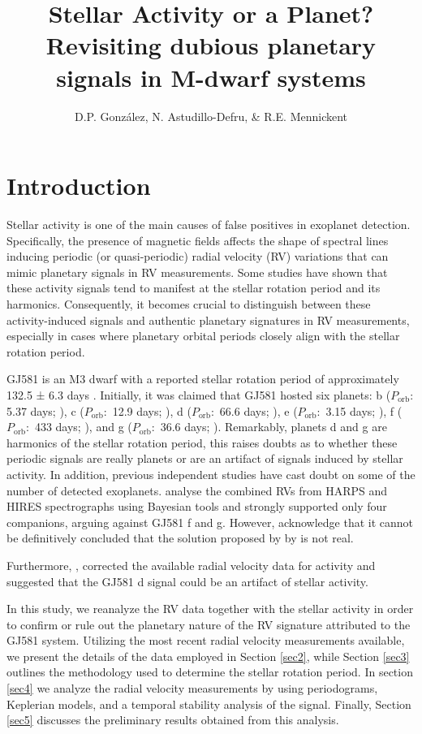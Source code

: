 \documentclass[baaa]{baaa}
\title{Stellar Activity or a Planet? Revisiting dubious planetary signals in M-dwarf systems}
\author{
D.P. González\inst{1},
N. Astudillo-Defru\inst{2},
\&
R.E. Mennickent\inst{1}
}
\institute{
Departamento de Astronomía, Universidad de Concepción, Chile\and Departamento de Matemática y Física Aplicadas, Universidad Católica de la Santísima Concepción, Chile
}
\begin{document}
\maketitle
\section{Introduction}\label{S_intro}

Stellar activity is one of the main causes of false positives in exoplanet detection. Specifically, the presence of magnetic fields affects the shape of spectral lines inducing periodic (or quasi-periodic) radial velocity (RV) variations that can mimic planetary signals in RV measurements. Some studies
\citep{2011Boisse,PaulaGorrini} have shown that these activity signals tend to manifest at the stellar rotation period and its harmonics. Consequently, it becomes crucial to distinguish between these activity-induced signals and authentic planetary signatures in RV measurements, especially in cases where planetary orbital periods closely align with the stellar rotation period.

GJ581 is an M3 dwarf with a reported stellar rotation period of approximately 132.5 ± 6.3 days \citep{SUAREZMASCAREÑO2017}.
Initially, it was claimed that GJ581 hosted six planets: b ($P_{\mathrm{orb}}$: 5.37 days; \citealp{2005Bonfils}), c ($P_{\mathrm{orb}}:$ 12.9 days; \citealp{2007UDRY}), d ($P_{\mathrm{orb}}:$ 66.6 days; \citealp{2009Mayor}), e ($P_{\mathrm{orb}}:$ 3.15 days; \citealp{2009Mayor}), f ($P_{\mathrm{orb}}:$ 433 days; \citealp{2010AVogt}), and g ($P_{\mathrm{orb}}:$ 36.6 days; \citealp{2010AVogt}). Remarkably, planets d and g are harmonics of the stellar rotation period, this raises doubts as to whether these periodic signals are really planets or are an artifact of signals induced by stellar activity. In addition, previous independent studies have cast doubt on some of the number of detected exoplanets. \cite{2011Tuomi} analyse the combined RVs from HARPS and HIRES spectrographs using Bayesian tools and strongly supported only four companions, arguing against GJ581 f and g. However, \cite{2011Tuomi} acknowledge that it cannot be definitively concluded that the solution proposed by by \cite{2010AVogt} is not real.

Furthermore, \cite{2014Robertson}, corrected the available radial velocity data for activity and suggested that the GJ581 d signal could be an artifact of stellar activity. 


In this study, we reanalyze the RV data together with the stellar activity in order to confirm or rule out the planetary nature of the RV signature attributed to the GJ581 system.  Utilizing the most recent radial velocity measurements available, we present the details of the data employed in Section \ref{sec2}, while Section \ref{sec3} outlines the methodology used to determine the stellar rotation period. In section \ref{sec4} we analyze the radial velocity measurements by using periodograms, Keplerian models, and a temporal stability analysis of the signal. Finally, Section \ref{sec5} discusses the preliminary results obtained from this analysis.
\end{document}
